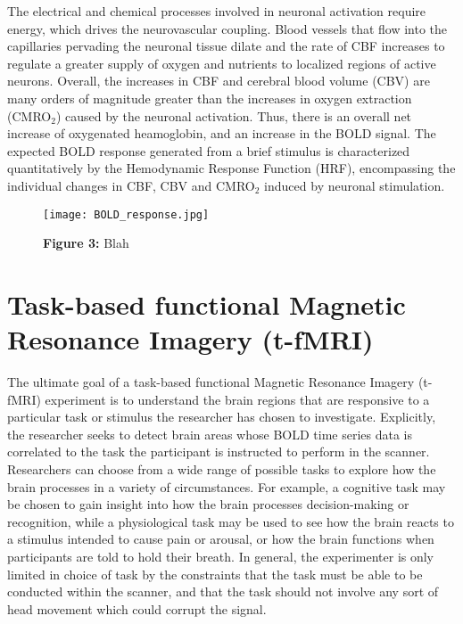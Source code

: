 The electrical and chemical processes involved in neuronal activation require energy, which drives the neurovascular coupling. Blood vessels that flow into the capillaries pervading the neuronal tissue dilate and the rate of CBF increases to regulate a greater supply of oxygen and nutrients to localized regions of active neurons. Overall, the increases in CBF and cerebral blood volume (CBV) are many orders of magnitude greater than the increases in oxygen extraction (CMRO$_{2}$) caused by the neuronal activation. Thus, there is an overall net increase of oxygenated heamoglobin, and an increase in the BOLD signal. The expected BOLD response generated from a brief stimulus is characterized quantitatively by the Hemodynamic Response Function (HRF), encompassing the individual changes in CBF, CBV and CMRO$_{2}$ induced by neuronal stimulation. 

\begin{figure}[htbp]
\centering
	\texttt{[image: BOLD\_response.jpg]}	
\caption*{\textbf{Figure 3:} Blah}
\end{figure}


\section{Task-based functional Magnetic Resonance Imagery (t-fMRI)} 
\label{sec:t-fMRI}

The ultimate goal of a task-based functional Magnetic Resonance Imagery (t-fMRI) experiment is to understand the brain regions that are responsive to a particular task or stimulus the researcher has chosen to investigate. Explicitly, the researcher seeks to detect brain areas whose BOLD time series data is correlated to the task the participant is instructed to perform in the scanner. Researchers can choose from a wide range of possible tasks to explore how the brain processes in a variety of circumstances. For example, a cognitive task may be chosen to gain insight into how the brain processes decision-making or recognition, while a physiological task may be used to see how the brain reacts to a stimulus intended to cause pain or arousal, or how the brain functions when participants are told to hold their breath. In general, the experimenter is only limited in choice of task by the constraints that the task must be able to be conducted within the scanner, and that the task should not involve any sort of head movement which could corrupt the signal. 

